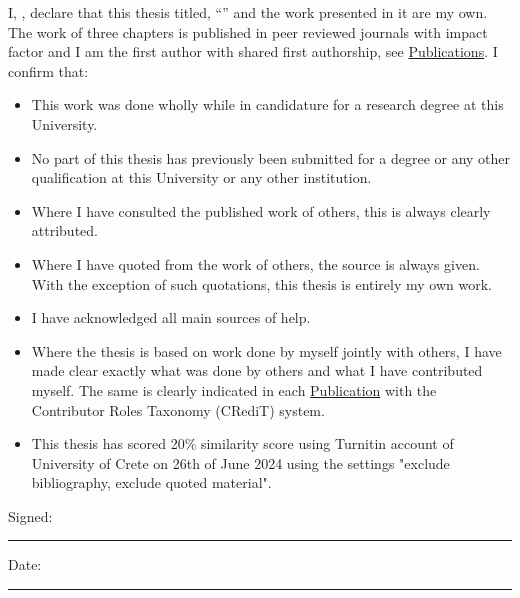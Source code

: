 \documentclass[
11pt, %
english, %
singlespacing, %
liststotoc, %
toctotoc, %
headsepline, %
]{MastersDoctoralThesis} %
\begin{document}

\begin{declaration}
\addchaptertocentry{\authorshipname} %
\noindent I, \authorname, declare that this thesis titled, \enquote{\ttitle} and the work presented in it are my own. The work of three chapters is 
published in peer reviewed journals with impact factor and I am the first author with shared first authorship, see \hyperref[app:publications]{Publications}. I confirm that:

\begin{itemize} 
    \item This work was done wholly while in candidature for a research degree at this University.
    \item No part of this thesis has previously been submitted for a degree or any other qualification at this University or any other institution.
    \item Where I have consulted the published work of others, this is always clearly attributed.
    \item Where I have quoted from the work of others, the source is always given. With the exception of such quotations, this thesis is entirely my own work.
    \item I have acknowledged all main sources of help.
    \item Where the thesis is based on work done by myself jointly with others, I have made clear exactly what was done by others and what I have contributed myself. The same is clearly indicated in each \hyperref[app:publications]{Publication} with the Contributor Roles Taxonomy (CRediT) system.
    \item This thesis has scored 20\% similarity score using Turnitin account of University of Crete on 26th of June 2024 using the settings "exclude bibliography, exclude quoted material".
\end{itemize}
% 
\noindent Signed:\\
\rule[0.5em]{25em}{0.5pt} %
 
\noindent Date:\\
\rule[0.5em]{25em}{0.5pt} %
\end{declaration}
%

\end{document}
